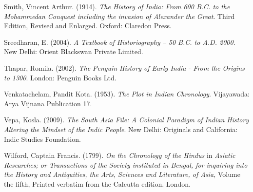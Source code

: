 \begin{thebibliography}{99}
  Smith, Vincent Arthur. (1914). \textit{The History of India: From 600 B.C. to the Mohammedan Conquest including the invasion of Alexander the Great}. Third Edition, Revised and Enlarged. Oxford: Claredon Press.

  Sreedharan, E. (2004). \textit{A Textbook of Historiography – 50 B.C. to A.D. 2000.} New Delhi: Orient Blackswan Private Limited.

  Thapar, Romila. (2002). \textit{The Penguin History of Early India - From the Origins to 1300}. London: Penguin Books Ltd.

  Venkatachelam, Pandit Kota. (1953). \textit{The Plot in Indian Chronology}. Vijayawada: Arya Vijnana Publication 17.

  Vepa, Kosla. (2009). \textit{The South Asia File: A Colonial Paradigm of Indian History Altering the Mindset of the Indic People}. New Delhi: Originals and California: Indic Studies Foundation.

  Wilford, Captain Francis. (1799). \textit{On the Chronology of the Hindus} in \textit{Asiatic Researches; or Transactions of the Society instituted in Bengal, for inquiring into the History and Antiquities, the Arts, Sciences and Literature, of Asia,} Volume the fifth, Printed verbatim from the Calcutta edition. London.
 
 \end{thebibliography}

\theendnotes

